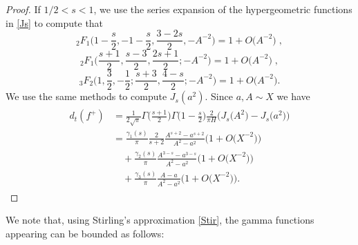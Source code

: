 \documentclass[a4paper,11pt]{amsart}
\theoremstyle{definition}
\begin{document}
\begin{proof}
If $1/2<s<1$, we use the series expansion of the hypergeometric functions in \eqref{Js} to compute that
$$_2F_1\Big(1-\frac{s}{2},-1-\frac{s}{2},\frac{3-2s}{2},-A^{-2}\Big)=1+O\big(A^{-2}\big) \; ,$$
$$_2F_1\Big(\frac{s+1}{2},\frac{s-3}{2},\frac{2s+1}{2};-A^{-2}\Big)=1+O\big(A^{-2}\big) \; ,$$ $$_3F_2\Big(1,\frac{3}{2},-\frac{1}{2};\frac{s+3}{2},\frac{4-s}{2};-A^{-2}\Big)=1+O\big(A^{-2}\big).$$
We use the same methods to compute $J_s(a^2)$.
Since $a,A \sim X$ we have
\begin{align}
    \begin{split}
        d_t(f^{+})&= \frac{1}{2\sqrt{\pi}}\Gamma\Big(\frac{s+1}{2}\Big)\Gamma\Big(1-\frac{s}{2}\Big)\frac{2}{\pi H}\big(J_s\big(A^2\big)-J_s\big(a^2\big)\big) \\
        &=\frac{\gamma_1(s)}{\pi}\frac{2}{s+2}\frac{A^{s+2}-a^{s+2}}{A^2-a^2}\big(1+O\big(X^{-2}\big)\big) \\
        &\quad +\frac{\gamma_2(s)}{\pi}\frac{A^{3-s}-a^{3-s}}{A^2-a^2}\big(1+O\big(X^{-2}\big)\big)\\
        &\quad +\frac{\gamma_3(s)}{\pi}\frac{A-a}{A^2-a^2}\big(1+O\big(X^{-2}\big)\big).
    \end{split}
\end{align}
\end{proof}
We note that, using Stirling's approximation \eqref{Stir}, the gamma functions appearing can be bounded as follows:
\end{document}
